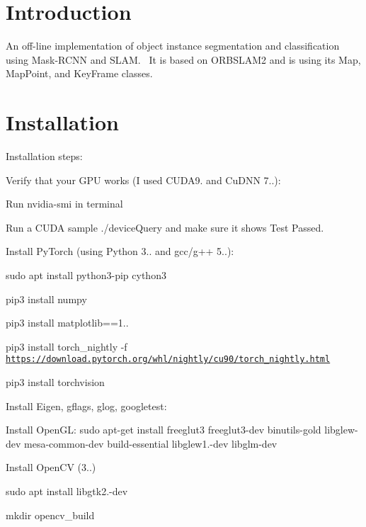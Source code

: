 \hypertarget{index_intro_sec}{}\section{Introduction}\label{index_intro_sec}
An off-\/line implementation of object instance segmentation and classification using Mask-\/\+R\+C\+NN and S\+L\+AM.~\newline
 It is based on O\+R\+B\+S\+L\+A\+M2 and is using its Map, Map\+Point, and Key\+Frame classes.\hypertarget{index_install_sec}{}\section{Installation}\label{index_install_sec}
Installation steps\+:
\begin{DoxyItemize}
\item Verify that your G\+PU works (I used C\+U\+D\+A9. and Cu\+D\+NN 7..)\+:
\begin{DoxyEnumerate}
\item Run nvidia-\/smi in terminal
\item Run a C\+U\+DA sample ./device\+Query and make sure it shows Test Passed.
\end{DoxyEnumerate}
\item Install Py\+Torch (using Python 3.. and gcc/g++ 5..)\+:
\begin{DoxyEnumerate}
\item sudo apt install python3-\/pip cython3
\item pip3 install numpy
\item pip3 install matplotlib==1..
\item pip3 install torch\+\_\+nightly -\/f \href{https://download.pytorch.org/whl/nightly/cu90/torch_nightly.html}{\tt https\+://download.\+pytorch.\+org/whl/nightly/cu90/torch\+\_\+nightly.\+html}
\item pip3 install torchvision
\end{DoxyEnumerate}
\item Install Eigen, gflags, glog, googletest\+:
\item Install Open\+GL\+: sudo apt-\/get install freeglut3 freeglut3-\/dev binutils-\/gold libglew-\/dev mesa-\/common-\/dev build-\/essential libglew1.-\/dev libglm-\/dev
\item Install Open\+CV (3..)
\begin{DoxyEnumerate}
\item sudo apt install libgtk2.-\/dev
\item mkdir opencv\+\_\+build

\end{DoxyEnumerate}
\end{DoxyItemize}
